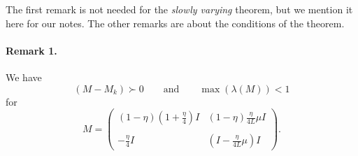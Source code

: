 \documentclass[11pt]{article}
\begin{document}

\bigskip
The first remark is not needed for the \emph{slowly varying} theorem, but we mention it here for our notes.  The other remarks are about the conditions of the theorem.

\bigskip
\noindent
\paragraph{Remark 1.} We have 
\[
 (M-M_k)\succ 0 \qquad \mbox{and} \qquad \max(\lambda(M))<1
\]
for
\[
 M = \begin{pmatrix} (1-\eta)(1+\displaystyle\frac{\eta}{4})I & (1-\eta)\displaystyle\frac{\eta}{4L} \mu I\\  
 \\
                   -\displaystyle\frac{\eta}{4} I  & (I-\displaystyle\frac{\eta}{4L}\mu) I \end{pmatrix}.                  
\]

\bigskip
\end{document}
